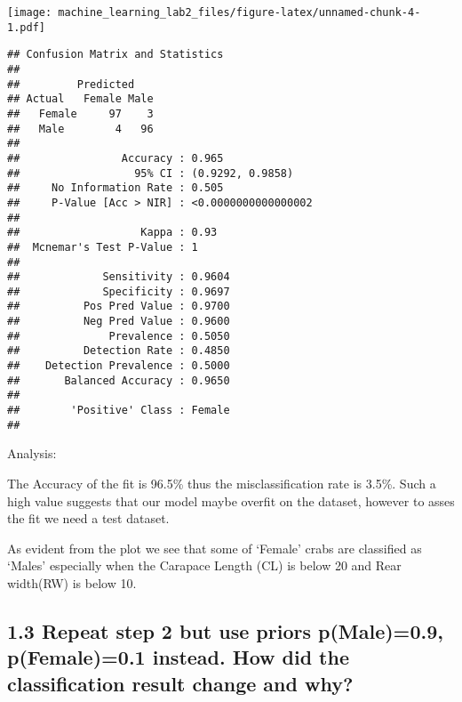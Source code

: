 \documentclass[]{article}
\newenvironment{Shaded}{\begin{snugshade}}{\end{snugshade}}
\newcommand{\KeywordTok}[1]{\textcolor[rgb]{0.13,0.29,0.53}{\textbf{#1}}}
\newcommand{\StringTok}[1]{\textcolor[rgb]{0.31,0.60,0.02}{#1}}
\newcommand{\OperatorTok}[1]{\textcolor[rgb]{0.81,0.36,0.00}{\textbf{#1}}}
\newcommand{\NormalTok}[1]{#1}
\begin{document}
\texttt{[image: machine\_learning\_lab2\_files/figure-latex/unnamed-chunk-4-1.pdf]}

\begin{Shaded}
\end{Shaded}

\begin{verbatim}
## Confusion Matrix and Statistics
## 
##         Predicted
## Actual   Female Male
##   Female     97    3
##   Male        4   96
##                                              
##                Accuracy : 0.965              
##                  95% CI : (0.9292, 0.9858)   
##     No Information Rate : 0.505              
##     P-Value [Acc > NIR] : <0.0000000000000002
##                                              
##                   Kappa : 0.93               
##  Mcnemar's Test P-Value : 1                  
##                                              
##             Sensitivity : 0.9604             
##             Specificity : 0.9697             
##          Pos Pred Value : 0.9700             
##          Neg Pred Value : 0.9600             
##              Prevalence : 0.5050             
##          Detection Rate : 0.4850             
##    Detection Prevalence : 0.5000             
##       Balanced Accuracy : 0.9650             
##                                              
##        'Positive' Class : Female             
## 
\end{verbatim}

Analysis:

The Accuracy of the fit is 96.5\% thus the misclassification rate is
3.5\%. Such a high value suggests that our model maybe overfit on the
dataset, however to asses the fit we need a test dataset.

As evident from the plot we see that some of `Female' crabs are
classified as `Males' especially when the Carapace Length (CL) is below
20 and Rear width(RW) is below 10.

\subsection{1.3 Repeat step 2 but use priors p(Male)=0.9, p(Female)=0.1
instead. How did the classification result change and
why?}\label{repeat-step-2-but-use-priors-pmale0.9-pfemale0.1-instead.-how-did-the-classification-result-change-and-why}
\end{document}
